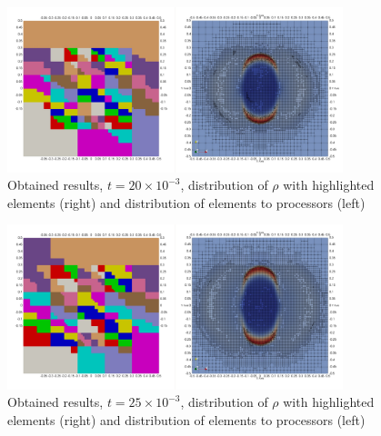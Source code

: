 \begin{figure}[H]
	\begin{center}
		\includegraphics[width=0.87\textwidth]{img//mhd-blast/old/mya5.jpg}
	\caption{Obtained results, $t = 20\times 10^{-3}$, distribution of $\rho$ with highlighted elements (right) and distribution of elements to processors (left)}
	\label{figure:blastOldMyAdapt5}
	\end{center}
\end{figure}
\vspace{-8mm}

\begin{figure}[H]
	\begin{center}
		\includegraphics[width=0.87\textwidth]{img//mhd-blast/old/mya6.jpg}
	\caption{Obtained results, $t = 25\times 10^{-3}$, distribution of $\rho$ with highlighted elements (right) and distribution of elements to processors (left)}
	\label{figure:blastOldMyAdapt6}
	\end{center}
\end{figure}
\vspace{-8mm}

